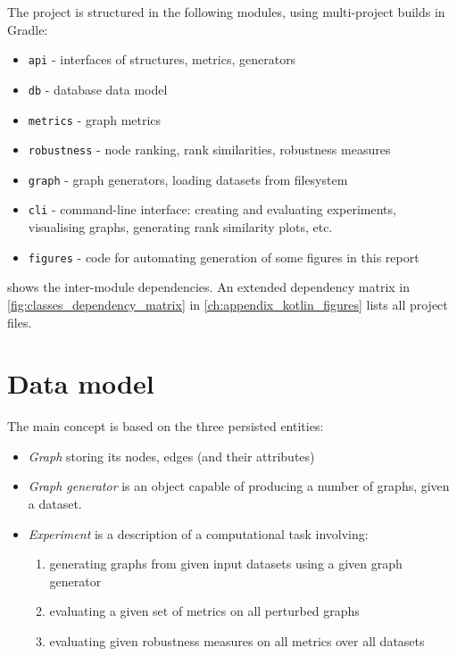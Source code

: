 The project is structured in the following modules, using multi-project builds in Gradle:
\begin{itemize}[itemsep=-2pt,topsep=5pt]
    \item \texttt{api} - interfaces of structures, metrics, generators
    \item \texttt{db} - database data model
    \item \texttt{metrics} - graph metrics
    \item \texttt{robustness} - node ranking, rank similarities, robustness measures
    \item \texttt{graph} - graph generators, loading datasets from filesystem
    \item \texttt{cli} - command-line interface: creating and evaluating experiments, visualising graphs, generating rank similarity plots, etc.
    \item \texttt{figures} - code for automating generation of some figures in this report
\end{itemize}

 shows the inter-module dependencies.
An extended dependency matrix in \cref{fig:classes_dependency_matrix} in \cref{ch:appendix_kotlin_figures} lists all project files.


\section{Data model}

The main concept is based on the three persisted entities:
\begin{itemize}[topsep=5pt]
    \item \textsl{Graph} storing its nodes, edges (and their attributes)
    \item \textsl{Graph generator} is an object capable of producing a number of graphs, given a dataset.
    \item \textsl{Experiment} is a description of a computational task involving:
    \begin{enumerate}[topsep=0pt,itemsep=0pt]
        \item generating graphs from given input datasets using a given graph generator
        \item evaluating a given set of metrics on all perturbed graphs
        \item evaluating given robustness measures on all metrics over all datasets
    \end{enumerate}
\end{itemize}

